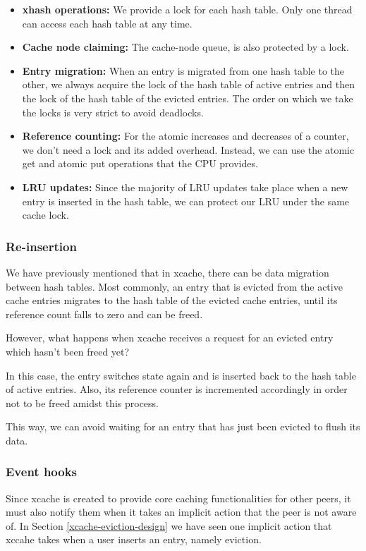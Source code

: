 \begin{itemize}
	\item
		\textbf{xhash operations:} We provide a lock for each hash 
		table. Only one thread can access each hash table at any time.
	\item
		\textbf{Cache node claiming:} The cache-node queue, is also 
		protected by a lock.
	\item
		\textbf{Entry migration:} When an entry is migrated from one 
		hash table to the other, we always acquire the lock of the hash 
		table of active entries and then the lock of the hash table of 
		the evicted entries. The order on which we take the locks is 
		very strict to avoid deadlocks.
	\item
		\textbf{Reference counting:} For the atomic increases and 
		decreases of a counter, we don't need a lock and its added 
		overhead. Instead, we can use the atomic get and atomic put 
		operations that the CPU provides.
	\item
		\textbf{LRU updates:} Since the majority of LRU updates take
		place when a new entry is inserted in the hash table, we can 
		protect our LRU under the same cache lock.
\end{itemize}

\subsubsection{Re-insertion}

We have previously mentioned that in xcache, there can be data migration 
between hash tables. Most commonly, an entry that is evicted from the active 
cache entries migrates to the hash table of the evicted cache entries, until 
its reference count falls to zero and can be freed.

However, what happens when xcache receives a request for an evicted entry which 
hasn't been freed yet? 

In this case, the entry switches state again and is inserted back to the hash 
table of active entries. Also, its reference counter is incremented accordingly 
in order not to be freed amidst this process.

This way, we can avoid waiting for an entry that has just been evicted to flush 
its data. 

\subsubsection{Event hooks}

Since xcache is created to provide core caching functionalities for other 
peers, it must also notify them when it takes an implicit action that the peer 
is not aware of. In Section \ref{xcache-eviction-design} we have seen one 
implicit action that xccahe takes when a user inserts an entry, namely 
eviction. 

